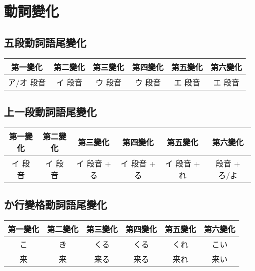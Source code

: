 \documentclass[12pt]{article}
\begin{document}
\begin{CJK}{UTF8}{nsung}
\begin{table}[htdp]
\begin{tabular}{cccccccccc}
\hline
\end{tabular}
\end{table}

\section{動詞變化}

\subsection{五段動詞語尾變化}
\begin{table}[htdp]
\begin{tabular}{cccccc}
第一變化 & 第二變化 & 第三變化 & 第四變化 & 第五變化 & 第六變化 \\
\hline
ア/オ 段音 & イ 段音 & ウ 段音 & ウ 段音  & エ 段音 & エ 段音  \\
\end{tabular}
\end{table}

\subsection{上一段動詞語尾變化}
\begin{table}[htdp]
\begin{tabular}{cccccc}
第一變化 & 第二變化 & 第三變化 & 第四變化 & 第五變化 & 第六變化 \\
\hline
イ 段音 & イ 段音 & イ 段音 + る &  イ 段音 + る &  イ 段音 + れ &  段音 + ろ/よ \\
\end{tabular}
\end{table}

\subsection{か行變格動詞語尾變化}
\begin{table}[htdp]
\begin{tabular}{cccccc}
第一變化 & 第二變化 & 第三變化 & 第四變化 & 第五變化 & 第六變化 \\
\hline
こ & き & くる & くる & くれ& こい \\
来 & 来 & 来る & 来る & 来れ& 来い \\
\end{tabular}
\end{table}

\begin{comment}
\end{comment}
\end{CJK}
\end{document}
